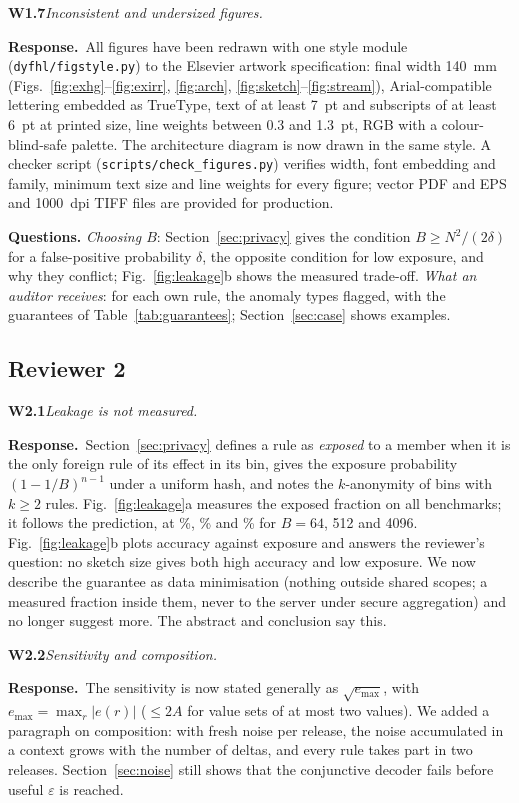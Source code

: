 \documentclass[11pt,a4paper]{article}
\newcommand{\concern}[2]{\medskip\noindent\textbf{#1}\quad\emph{#2}\par\smallskip}
\newcommand{\resp}{\noindent\textcolor{blue!55!black}{\textbf{Response.}}\ }
\begin{document}
\concern{W1.7}{Inconsistent and undersized figures.}
\resp All figures have been redrawn with one style module (\texttt{dyfhl/figstyle.py}) to the Elsevier artwork specification: final width 140~mm (Figs.~\ref{fig:exhg}--\ref{fig:exirr}, \ref{fig:arch}, \ref{fig:sketch}--\ref{fig:stream}), Arial-compatible lettering embedded as TrueType, text of at least 7~pt and subscripts of at least 6~pt at printed size, line weights between 0.3 and 1.3~pt, RGB with a colour-blind-safe palette. The architecture diagram is now drawn in the same style. A checker script (\texttt{scripts/check\_figures.py}) verifies width, font embedding and family, minimum text size and line weights for every figure; vector PDF and EPS and 1000~dpi TIFF files are provided for production.

\textbf{Questions.} \emph{Choosing $B$}: Section~\ref{sec:privacy} gives the condition $B\ge N^2/(2\delta)$ for a false-positive probability $\delta$, the opposite condition for low exposure, and why they conflict; Fig.~\ref{fig:leakage}b shows the measured trade-off. \emph{What an auditor receives}: for each own rule, the anomaly types flagged, with the guarantees of Table~\ref{tab:guarantees}; Section~\ref{sec:case} shows examples.

\subsection*{Reviewer 2}
\concern{W2.1}{Leakage is not measured.}
\resp Section~\ref{sec:privacy} defines a rule as \emph{exposed} to a member when it is the only foreign rule of its effect in its bin, gives the exposure probability $(1-1/B)^{n-1}$ under a uniform hash, and notes the $k$-anonymity of bins with $k\ge2$ rules. Fig.~\ref{fig:leakage}a measures the exposed fraction on all benchmarks; it follows the prediction, at \lkallBlxiv\%, \lkallBdxii\% and \lkallBmmmmxcvi\% for $B=64$, 512 and 4096. Fig.~\ref{fig:leakage}b plots accuracy against exposure and answers the reviewer's question: no sketch size gives both high accuracy and low exposure. We now describe the guarantee as data minimisation (nothing outside shared scopes; a measured fraction inside them, never to the server under secure aggregation) and no longer suggest more. The abstract and conclusion say this.

\concern{W2.2}{Sensitivity and composition.}
\resp The sensitivity is now stated generally as $\sqrt{e_{\max}}$, with $e_{\max}=\max_r|e(r)|$ ($\le2A$ for value sets of at most two values). We added a paragraph on composition: with fresh noise per release, the noise accumulated in a context grows with the number of deltas, and every rule takes part in two releases. Section~\ref{sec:noise} still shows that the conjunctive decoder fails before useful $\varepsilon$ is reached.
\end{document}
